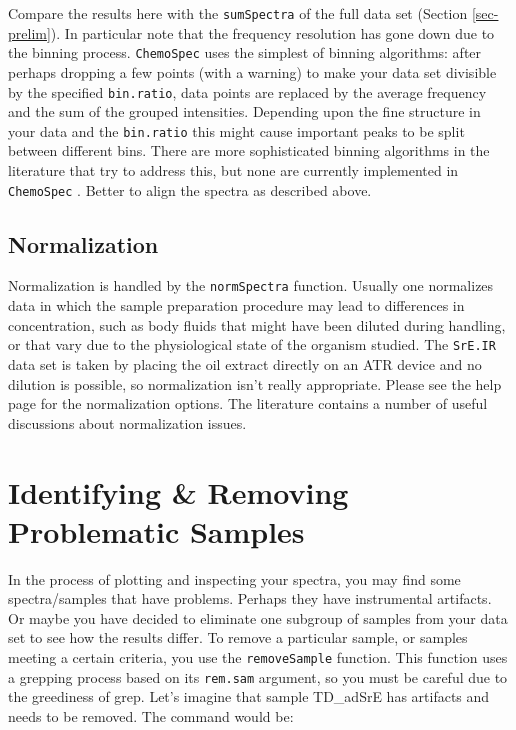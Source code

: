 \documentclass[letter,10pt,twocolumn,twoside,printwatermark=false]{pinp}
\begin{document}
Compare the results here with the \texttt{sumSpectra} of the full data
set (Section \ref{sec-prelim}). In particular note that the frequency
resolution has gone down due to the binning process. \texttt{ChemoSpec}
uses the simplest of binning algorithms: after perhaps dropping a few
points (with a warning) to make your data set divisible by the specified
\texttt{bin.ratio}, data points are replaced by the average frequency
and the sum of the grouped intensities. Depending upon the fine
structure in your data and the \texttt{bin.ratio} this might cause
important peaks to be split between different bins. There are more
sophisticated binning algorithms in the literature that try to address
this, but none are currently implemented in \texttt{ChemoSpec}
\citep{Gaussian-binning, Adaptive-binning}. Better to align the spectra
as described above.

\hypertarget{normalization}{%
\subsection{Normalization}\label{normalization}}

Normalization is handled by the \texttt{normSpectra} function. Usually
one normalizes data in which the sample preparation procedure may lead
to differences in concentration, such as body fluids that might have
been diluted during handling, or that vary due to the physiological
state of the organism studied. The \texttt{SrE.IR} data set is taken by
placing the oil extract directly on an ATR device and no dilution is
possible, so normalization isn't really appropriate. Please see the help
page for the normalization options. The literature contains a number of
useful discussions about normalization
issues.\citep{Scale-Norm-Nicholson, NMR-Norm, Cent-Scale-Norm, Filz, Raftery-Signal-Processing}

\hypertarget{identifying-removing-problematic-samples}{%
\section{Identifying \& Removing Problematic
Samples}\label{identifying-removing-problematic-samples}}

In the process of plotting and inspecting your spectra, you may find
some spectra/samples that have problems. Perhaps they have instrumental
artifacts. Or maybe you have decided to eliminate one subgroup of
samples from your data set to see how the results differ. To remove a
particular sample, or samples meeting a certain criteria, you use the
\texttt{removeSample} function. This function uses a grepping process
based on its \texttt{rem.sam} argument, so you must be careful due to
the greediness of grep. Let's imagine that sample TD\_adSrE has
artifacts and needs to be removed. The command would be:
\end{document}
